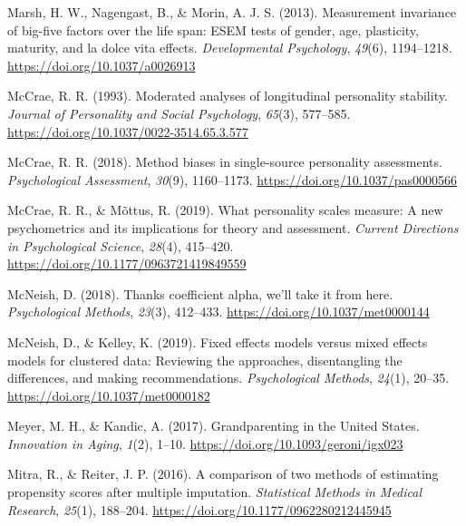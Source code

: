 \documentclass[
  english,
  man, noextraspace,floatsintext]{apa7}
\begin{document}
\leavevmode\hypertarget{ref-marshMeasurementInvarianceBigfive2013}{}%
Marsh, H. W., Nagengast, B., \& Morin, A. J. S. (2013). Measurement invariance of big-five factors over the life span: ESEM tests of gender, age, plasticity, maturity, and la dolce vita effects. \emph{Developmental Psychology}, \emph{49}(6), 1194--1218. \url{https://doi.org/10.1037/a0026913}

\leavevmode\hypertarget{ref-mccraeModeratedAnalysesLongitudinal1993}{}%
McCrae, R. R. (1993). Moderated analyses of longitudinal personality stability. \emph{Journal of Personality and Social Psychology}, \emph{65}(3), 577--585. \url{https://doi.org/10.1037/0022-3514.65.3.577}

\leavevmode\hypertarget{ref-mccraeMethodBiasesSinglesource2018}{}%
McCrae, R. R. (2018). Method biases in single-source personality assessments. \emph{Psychological Assessment}, \emph{30}(9), 1160--1173. \url{https://doi.org/10.1037/pas0000566}

\leavevmode\hypertarget{ref-mccraeWhatPersonalityScales2019}{}%
McCrae, R. R., \& Mõttus, R. (2019). What personality scales measure: A new psychometrics and its implications for theory and assessment. \emph{Current Directions in Psychological Science}, \emph{28}(4), 415--420. \url{https://doi.org/10.1177/0963721419849559}

\leavevmode\hypertarget{ref-mcneishThanksCoefficientAlpha2018}{}%
McNeish, D. (2018). Thanks coefficient alpha, we'll take it from here. \emph{Psychological Methods}, \emph{23}(3), 412--433. \url{https://doi.org/10.1037/met0000144}

\leavevmode\hypertarget{ref-mcneishFixedEffectsModels2019}{}%
McNeish, D., \& Kelley, K. (2019). Fixed effects models versus mixed effects models for clustered data: Reviewing the approaches, disentangling the differences, and making recommendations. \emph{Psychological Methods}, \emph{24}(1), 20--35. \url{https://doi.org/10.1037/met0000182}

\leavevmode\hypertarget{ref-meyerGrandparentingUnitedStates2017}{}%
Meyer, M. H., \& Kandic, A. (2017). Grandparenting in the United States. \emph{Innovation in Aging}, \emph{1}(2), 1--10. \url{https://doi.org/10.1093/geroni/igx023}

\leavevmode\hypertarget{ref-mitraComparisonTwoMethods2016}{}%
Mitra, R., \& Reiter, J. P. (2016). A comparison of two methods of estimating propensity scores after multiple imputation. \emph{Statistical Methods in Medical Research}, \emph{25}(1), 188--204. \url{https://doi.org/10.1177/0962280212445945}
\end{document}
